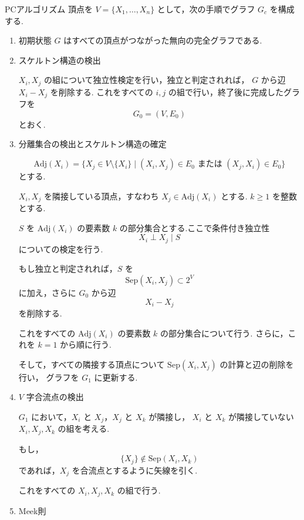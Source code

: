 \documentclass[uplatex, dvipdfmx]{jsarticle}
\begin{document}
\begin{defn}{PCアルゴリズム}
  頂点を $V=\{X_1,\ldots,X_n\}$ として，次の手順でグラフ $G_c$ を構成する.

  \begin{enumerate}
    \item
      初期状態 $G$ はすべての頂点がつながった無向の完全グラフである.

    \item
      スケルトン構造の検出

      $X_i,X_j$ の組について独立性検定を行い，独立と判定されれば，
      $G$ から辺 $X_i-X_j$ を削除する.
      これをすべての $i,j$ の組で行い，終了後に完成したグラフを
      \[
        G_0=(V,E_0)
      \]
      とおく.

    \item
      分離集合の検出とスケルトン構造の確定

      \[
        \mathrm{Adj}(X_i)
        =
        \{X_j\in V\setminus\{X_i\}\mid (X_i,X_j)\in E_0
        \text{ または }(X_j,X_i)\in E_0\}
      \]
      とする.

      $X_i,X_j$ を隣接している頂点，すなわち $X_j\in \mathrm{Adj}(X_i)$ とする.
      $k\ge 1$ を整数とする.

      $S$ を $\mathrm{Adj}(X_i)$ の要素数 $k$ の部分集合とする.ここで条件付き独立性
      \[
        X_i\perp X_j\mid S
      \]
      についての検定を行う.

      もし独立と判定されれば，$S$ を
      \[
        \mathrm{Sep}(X_i,X_j)\subset 2^V
      \]
      に加え，さらに $G_0$ から辺
      \[
        X_i-X_j
      \]
      を削除する.

      これをすべての $\mathrm{Adj}(X_i)$ の要素数 $k$ の部分集合について行う.
      さらに，これを $k=1$ から順に行う.

      そして，すべての隣接する頂点について $\mathrm{Sep}(X_i,X_j)$ の計算と辺の削除を行い，
      グラフを $G_1$ に更新する.

  \item
    $V$ 字合流点の検出

    $G_1$ において，$X_i$ と $X_j$，$X_j$ と $X_k$ が隣接し，
    $X_i$ と $X_k$ が隣接していない $X_i,X_j,X_k$ の組を考える.

    もし，
    \[
      \{X_j\}\notin \mathrm{Sep}(X_i,X_k)
    \]
    であれば，$X_j$ を合流点とするように矢線を引く.

    これをすべての $X_i,X_j,X_k$ の組で行う.

  \item
    Meek則


\end{enumerate}
\end{defn}
\end{document}
